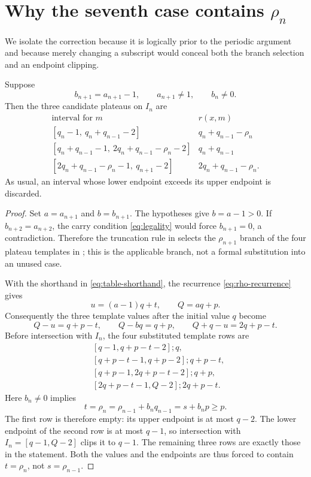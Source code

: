 \section{Why the seventh case contains \texorpdfstring{$\rho_n$}{rho-n}}
\label{sec:case-seven}

We isolate the correction because it is logically prior to the periodic
argument and because merely changing a subscript would conceal both the branch
selection and an endpoint clipping.

\begin{lemma}
\label{lem:case-seven}
Suppose
\[
 b_{n+1}=a_{n+1}-1,
 \qquad a_{n+1}\ne1,
 \qquad b_n\ne0.
\]
Then the three candidate plateaus on $I_n$ are
\[
\begin{array}{c|c}
\text{interval for }m&r(x,m)\\ \hline
[q_n-1,\ q_n+q_{n-1}-2]
  &q_n+q_{n-1}-\rho_n\\
{}[q_n+q_{n-1}-1,\ 2q_n+q_{n-1}-\rho_n-2]
  &q_n+q_{n-1}\\
{}[2q_n+q_{n-1}-\rho_n-1,\ q_{n+1}-2]
  &2q_n+q_{n-1}-\rho_n.
\end{array}
\]
As usual, an interval whose lower endpoint exceeds its upper endpoint is
discarded.
\end{lemma}

\begin{proof}
Set $a=a_{n+1}$ and $b=b_{n+1}$.  The hypotheses give
$b=a-1>0$.  If $b_{n+2}=a_{n+2}$, the carry condition
\eqref{eq:legality} would force $b_{n+1}=0$, a contradiction.  Therefore the
truncation rule in \cite[Proposition~2.2.2]{Wojcik2025v1} selects the
$\rho_{n+1}$ branch of the four plateau templates in
\cite[Corollary~2.2.1]{Wojcik2025v1}; this is the applicable branch, not a
formal substitution into an unused case.

With the shorthand in \eqref{eq:table-shorthand}, the recurrence
\eqref{eq:rho-recurrence} gives
\[
 u=(a-1)q+t,
 \qquad Q=aq+p.
\]
Consequently the three template values after the initial value $q$ become
\begin{equation}
 Q-u=q+p-t,
 \qquad Q-bq=q+p,
 \qquad Q+q-u=2q+p-t.
 \label{eq:case7-values}
\end{equation}
Before intersection with $I_n$, the four substituted template rows are
\begin{align*}
 &[q-1,q+p-t-2];q,\\
 &[q+p-t-1,q+p-2];q+p-t,\\
 &[q+p-1,2q+p-t-2];q+p,\\
 &[2q+p-t-1,Q-2];2q+p-t.
\end{align*}
Here $b_n\ne0$ implies
\begin{equation}
 t=\rho_n=\rho_{n-1}+b_nq_{n-1}=s+b_np\geq p.
 \label{eq:t-ge-p}
\end{equation}
The first row is therefore empty: its upper endpoint is at most $q-2$.
The lower endpoint of the second row is at most $q-1$, so intersection with
$I_n=[q-1,Q-2]$ clips it to $q-1$.  The remaining three rows are exactly those
in the statement.  Both the values and the endpoints are thus forced to
contain $t=\rho_n$, not $s=\rho_{n-1}$.
\end{proof}

